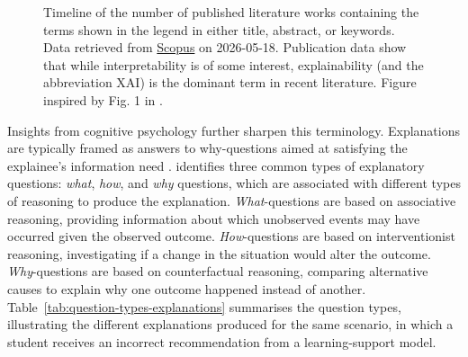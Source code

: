 \begin{figure}[ht]
    \centering
    \caption[Terminology timeline in \acs{XAI} literature]{Timeline of the number of published literature works containing the terms shown in the legend in either title, abstract, or keywords. Data retrieved from \href{https://www.scopus.com}{Scopus} on 2026-05-18. Publication data show that while interpretability is of some interest, explainability (and the abbreviation XAI) is the dominant term in recent literature. Figure inspired by Fig. 1 in \textcite{Arrieta2020}.}
    \label{fig:terminology-timeline}
\end{figure}

Insights from cognitive psychology further sharpen this terminology. Explanations are typically framed as answers to why-questions \parencite{Overton2011} aimed at satisfying the explainee's information need \parencite{Lipton1990}. \textcite{Miller2019} identifies three common types of explanatory questions: \textit{what}, \textit{how}, and \textit{why} questions, which are associated with different types of reasoning to produce the explanation. \textit{What}-questions are based on associative reasoning, providing information about which unobserved events may have occurred given the observed outcome. \textit{How}-questions are based on interventionist reasoning, investigating if a change in the situation would alter the outcome. \textit{Why}-questions are based on counterfactual reasoning, comparing alternative causes to explain why one outcome happened instead of another. Table~\ref{tab:question-types-explanations} summarises the question types, illustrating the different explanations produced for the same scenario, in which a student receives an incorrect recommendation from a learning-support model.

